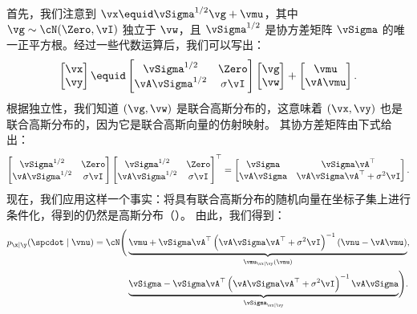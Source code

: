 \documentclass[../../book-main_zh.tex]{subfiles}
\begin{document}
\begin{example}
    首先，我们注意到 $\vx \equid \vSigma^{1/2} \vg + \vmu$，其中 $\vg \sim
    \cN(\Zero, \vI)$ 独立于 $\vw$，且 $\vSigma^{1/2}$ 是协方差矩阵 $\vSigma$ 的唯一正平方根。经过一些代数运算后，我们可以写出：
    \begin{equation*}
        \begin{bmatrix}
            \vx \\
            \vy
        \end{bmatrix}
        \equid
        \begin{bmatrix}
            \vSigma^{1/2} & \Zero \\
            \vA \vSigma^{1/2} & \sigma \vI
        \end{bmatrix}
        \begin{bmatrix}
            \vg \\
            \vw
        \end{bmatrix}
        +
        \begin{bmatrix}
            \vmu \\
            \vA\vmu
        \end{bmatrix}.
    \end{equation*}
    根据独立性，我们知道 $(\vg, \vw)$ 是联合高斯分布的，这意味着 $(\vx, \vy)$ 也是联合高斯分布的，因为它是联合高斯向量的仿射映射。
    其协方差矩阵由下式给出：
    \begin{equation*}
        \begin{bmatrix}
            \vSigma^{1/2} & \Zero \\
            \vA \vSigma^{1/2} & \sigma \vI
        \end{bmatrix}
        \begin{bmatrix}
            \vSigma^{1/2} & \Zero \\
            \vA \vSigma^{1/2} & \sigma \vI
        \end{bmatrix}^\top
        =
        \begin{bmatrix}
            \vSigma & \vSigma \vA^\top \\
            \vA \vSigma & \vA \vSigma \vA^\top + \sigma^2 \vI
        \end{bmatrix}.
    \end{equation*}
    现在，我们应用这样一个事实：将具有联合高斯分布的随机向量在坐标子集上进行条件化，得到的仍然是高斯分布（）。
    由此，我们得到：
    \begin{equation}
        \begin{split}
            p_{\x \mid \y}(\spcdot \mid \vnu) = \cN\Biggl(
                &\underbrace{%
                    \vmu + \vSigma\vA^\top \left(\vA\vSigma\vA^\top +
                    \sigma^2 \vI\right)^{-1}
                (\vnu - \vA\vmu)}_{\vmu_{\vx \mid \vy}(\vnu)}, \\
                &\underbrace{%
                    \vSigma - \vSigma \vA^\top
                    \left(\vA\vSigma\vA^\top + \sigma^2
                \vI\right)^{-1} \vA \vSigma}_{\vSigma_{\vx\mid \vy}}
            \Biggr).
        \end{split}
    \end{equation}


\end{example}
\end{document}
